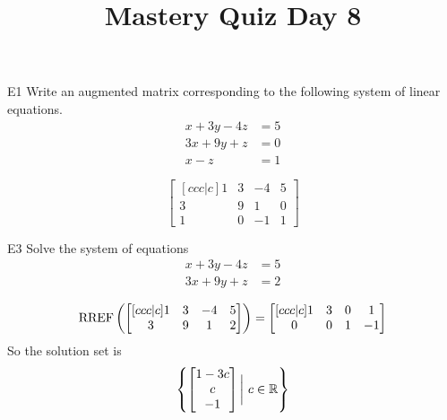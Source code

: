 \documentclass{sbgLAquiz}
\title{Mastery Quiz Day 8 }
\begin{document}
\begin{problem}{E1}
Write an augmented matrix corresponding to the following system of linear equations.
\begin{align*}
x+3y-4z &= 5 \\
3x+9y+z &= 0 \\
x-z &= 1
\end{align*}
\end{problem}
\begin{solution}
\[
\begin{bmatrix}[ccc|c]
1 & 3 & -4 & 5 \\
3 & 9 & 1 & 0 \\
1 & 0 & -1 & 1
\end{bmatrix}
\]
\end{solution}

\begin{problem}{E3}
Solve the system of equations
\begin{align*}
x+3y-4z &= 5 \\
3x+9y+z &= 2
\end{align*}
\end{problem}
\begin{solution}
$$\operatorname{RREF} \left(\begin{bmatrix}[ccc|c] 1 & 3 & -4 & 5 \\ 3 & 9 & 1 & 2 \end{bmatrix} \right) = \begin{bmatrix}[ccc|c] 1 & 3 & 0 & 1 \\ 0 & 0 & 1 & -1\end{bmatrix}$$
So the solution set is
$$\left\{ \begin{bmatrix} 1-3c \\ c \\ -1 \end{bmatrix} \bigg|\ c \in \mathbb{R} \right\}$$
\end{solution}
\end{document}
